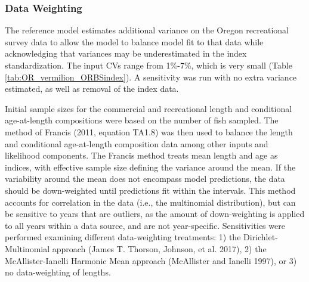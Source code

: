 \documentclass[11pt,
  english,
  a4paper,
]{article}
\begin{document}

\hypertarget{data-weighting}{%
\subsubsection{Data Weighting}\label{data-weighting}}

\leavevmode\tagmcend\tagstructend


The reference model estimates additional variance on the Oregon recreational survey data to allow the model to balance model fit to that data while acknowledging that variances may be underestimated in the index standardization. The input CVs range from 1\%-7\%, which is very small (Table \ref{tab:OR_vermilion_ORBSindex}). A sensitivity was run with no extra variance estimated, as well as removal of the index data.

\leavevmode\tagmcend\tagstructend\par


Initial sample sizes for the commercial and recreational length and conditional age-at-length compositions were based on the number of fish sampled. The method of Francis {(2011, equation TA1.8)\leavevmode\tagmcend\tagstructend} was then used to balance the length and conditional age-at-length composition data among other inputs and likelihood components. The Francis method treats mean length and age as indices, with effective sample size defining the variance around the mean. If the variability around the mean does not encompass model predictions, the data should be down-weighted until predictions fit within the intervals. This method accounts for correlation in the data (i.e., the multinomial distribution), but can be sensitive to years that are outliers, as the amount of down-weighting is applied to all years within a data source, and are not year-specific. Sensitivities were performed examining different data-weighting treatments: 1) the Dirichlet-Multinomial approach {(James T. Thorson, Johnson, et al. 2017)\leavevmode\tagmcend\tagstructend}, 2) the McAllister-Ianelli Harmonic Mean approach {(McAllister and Ianelli 1997)\leavevmode\tagmcend\tagstructend}, or 3) no data-weighting of lengths.
\end{document}
